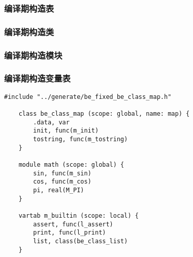 \subsubsection{编译期构造表}

\subsubsection{编译期构造类}

\subsubsection{编译期构造模块}

\subsubsection{编译期构造变量表}

\begin{lstlisting}[numbers=none]
    #include "../generate/be_fixed_be_class_map.h"
    
    class be_class_map (scope: global, name: map) {
        .data, var
        init, func(m_init)
        tostring, func(m_tostring)
    }
    
    module math (scope: global) {
        sin, func(m_sin)
        cos, func(m_cos)
        pi, real(M_PI)
    }
    
    vartab m_builtin (scope: local) {
        assert, func(l_assert)
        print, func(l_print)
        list, class(be_class_list)
    }
    \end{lstlisting}
    